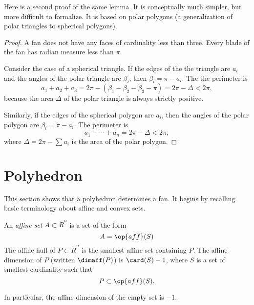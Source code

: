 Here is a second proof of the same lemma.  It is conceptually much simpler, but more difficult to formalize.  It is based on polar polygons (a generalization of polar triangles to spherical polygons).

\begin{proof} A fan does not have any faces of cardinality less than three.
Every blade of the fan has radian measure less than $\pi$.  
%

Consider the case of a spherical triangle.  If the edges of the
the triangle are $a_i$ and the angles of the polar
triangle are $\beta_i$, then $\beta_i=\pi-a_i$.
The the perimeter is 
$$a_1+a_2+a_3 = 2\pi - (\beta_1 -\beta_2 - \beta_3-\pi)= 2\pi-\Delta < 2\pi,$$
because the area $\Delta$ of the polar triangle is always strictly positive.
%

Similarly, if the edges of the spherical polygon are
$a_i$, then the angles of the polar polygon are $\beta_i = \pi-a_i$.
The perimeter is
$$
a_1+\cdots+a_n  = 2\pi- \Delta< 2\pi,
$$
where $\Delta = 2\pi-\sum a_i$ is the area of the polar polygon.
%
\end{proof}



\section{Polyhedron}

This section shows that a polyhedron determines a fan.  It begins by recalling basic terminology about affine and convex sets.

\begin{definition}
An  {\it affine set} $A\subset\ring{R}^n$ is a set of the form
$$
A=\op{aff}(S)
$$
The
affine hull of $P\subset\ring{R}^n$ is the smallest affine set containing $P$.  The affine dimension of $P$ (written $\dimaff(P)$) is $\card(S)-1$, where $S$ is a set of smallest cardinality such that
$$
P \subset \op{aff}(S).
$$
\end{definition}
In particular, the affine dimension of the empty set is $-1$.
%
%
%
%
%

